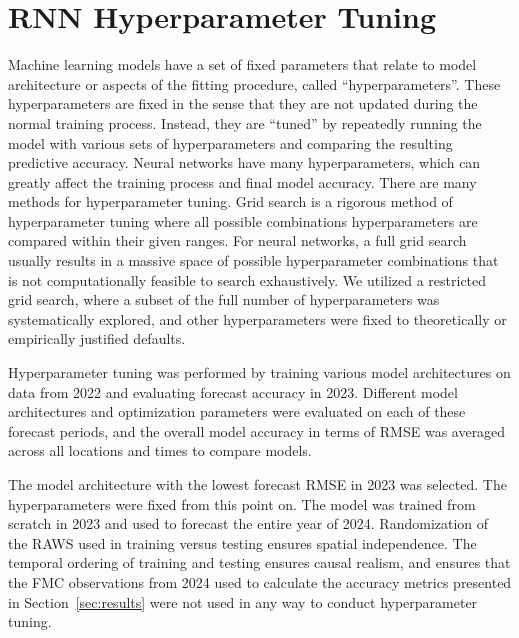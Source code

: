 \documentclass[fire,article,submit,pdftex,moreauthors]{Definitions/mdpi}
\begin{document}
\appendixstart
\appendix
\section[\appendixname~\thesection]{RNN Hyperparameter Tuning}
\label{sec:appendix_hyper}

Machine learning models have a set of fixed parameters that relate to model architecture or aspects of the fitting procedure, called ``hyperparameters''. These hyperparameters are fixed in the sense that they are not updated during the normal training process. Instead, they are ``tuned'' by repeatedly running the model with various sets of hyperparameters and comparing the resulting predictive accuracy. Neural networks have many hyperparameters, which can greatly affect the training process and final model accuracy. There are many methods for hyperparameter tuning. Grid search is a rigorous method of hyperparameter tuning where all possible combinations hyperparameters are compared within their given ranges. For neural networks, a full grid search usually results in a massive space of possible hyperparameter combinations that is not computationally feasible to search exhaustively. We utilized a restricted grid search, where a subset of the full number of hyperparameters was systematically explored, and other hyperparameters were fixed to theoretically or empirically justified defaults. 

Hyperparameter tuning was performed by training various model architectures on data from 2022 and evaluating forecast accuracy in 2023. Different model architectures and optimization parameters were evaluated on each of these forecast periods, and the overall model accuracy in terms of RMSE was averaged across all locations and times to compare models. 

The model architecture with the lowest forecast RMSE in 2023 was selected. The hyperparameters were fixed from this point on. The model was trained from scratch in 2023 and used to forecast the entire year of 2024. Randomization of the RAWS used in training versus testing ensures spatial independence. The temporal ordering of training and testing ensures causal realism, and ensures that the FMC observations from 2024 used to calculate the accuracy metrics presented in Section~\ref{sec:results} were not used in any way to conduct hyperparameter tuning.
\end{document}
